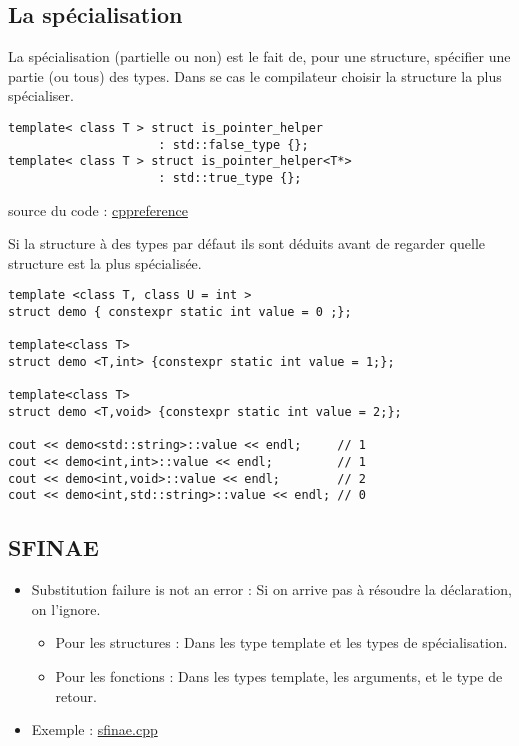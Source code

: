 \documentclass{beamer}
\begin{document}
\subsection{La spécialisation}

\begin{frame}[containsverbatim]
	La spécialisation (partielle ou non) est le fait de, pour une structure, spécifier une partie (ou tous) des types. Dans se cas le compilateur choisir la structure la plus spécialiser.\\
	
	\begin{lstlisting}
template< class T > struct is_pointer_helper    
                     : std::false_type {};
template< class T > struct is_pointer_helper<T*> 
                     : std::true_type {};
	\end{lstlisting}
	source du code : \href{http://en.cppreference.com/w/cpp/types/is_pointer}{cppreference}
\end{frame}

\begin{frame}[containsverbatim]
	Si la structure à des types par défaut ils sont déduits avant de regarder quelle structure est la plus spécialisée.
	\begin{lstlisting}
template <class T, class U = int >
struct demo { constexpr static int value = 0 ;};

template<class T>
struct demo <T,int> {constexpr static int value = 1;};

template<class T>
struct demo <T,void> {constexpr static int value = 2;};

cout << demo<std::string>::value << endl;     // 1
cout << demo<int,int>::value << endl;         // 1
cout << demo<int,void>::value << endl;        // 2
cout << demo<int,std::string>::value << endl; // 0
	\end{lstlisting}
	
\end{frame}

\subsection{SFINAE}
\begin{frame}[containsverbatim]

	\begin{itemize}
		\item Substitution failure is not an error : Si on arrive pas à résoudre la déclaration, on l'ignore.
		\begin{itemize}
			\item Pour les structures : Dans les type template et les types de spécialisation.
			\item Pour les fonctions : Dans les types template, les arguments, et le type de retour.
		\end{itemize}
		\item Exemple : \href{run:../code_demo/sfinae.cpp}{sfinae.cpp}
	\end{itemize}

	
\end{frame}
\end{document}
